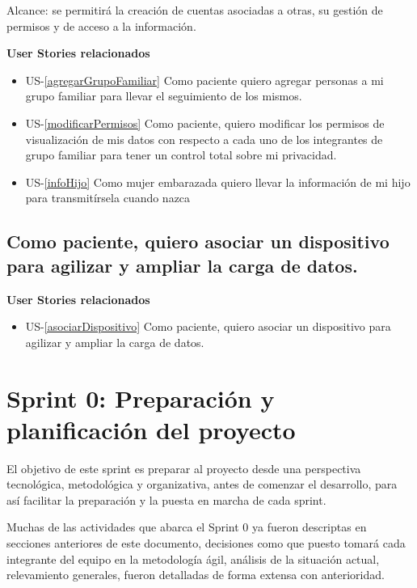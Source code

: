     Alcance: se permitirá la creación de cuentas asociadas a otras, su gestión de permisos y de acceso a la información.
    
        \textbf{User Stories relacionados}
        \begin{itemize}
			
			\item US-\ref{agregarGrupoFamiliar} Como paciente quiero agregar personas a mi grupo familiar para llevar el seguimiento de los mismos.
			\item US-\ref{modificarPermisos} Como paciente, quiero modificar los permisos de visualización de mis datos con respecto a  cada uno de los integrantes de grupo familiar para tener un control total sobre mi privacidad.
			\item US-\ref{infoHijo} Como mujer embarazada quiero llevar la información de mi hijo para transmitírsela cuando nazca
		\end{itemize}
        

\subsection{Como paciente, quiero asociar un dispositivo para agilizar y ampliar la carga de datos.}

		\textbf{User Stories relacionados}
		\begin{itemize}
			\item US-\ref{asociarDispositivo} Como paciente, quiero asociar un dispositivo para agilizar y ampliar la carga de datos.
		\end{itemize}
        
        
\section{Sprint 0: Preparación y planificación del proyecto}
El objetivo de este sprint es preparar al proyecto desde una perspectiva tecnológica, metodológica y organizativa, antes de comenzar el desarrollo, para así facilitar la preparación y la puesta en marcha de cada sprint.

Muchas de las actividades que abarca el Sprint 0 ya fueron descriptas en secciones anteriores de este documento, decisiones como que puesto tomará cada integrante del equipo en la metodología ágil, análisis de la situación actual, relevamiento generales, fueron detalladas de forma extensa con anterioridad.

